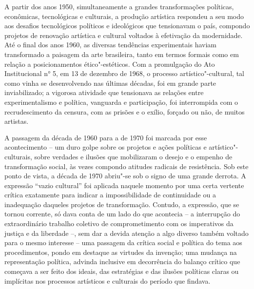 \pagebreak
\thispagestyle{empty}

\movetooddpage

A partir dos anos 1950, simultaneamente a grandes transformações
políticas, econômicas, tecnológicas e culturais, a produção artística
respondeu a seu modo aos desafios tecnológicos políticos e ideológicos
que tensionavam o país, compondo projetos de renovação artística e
cultural voltados à efetivação da modernidade. Até o final dos anos
1960, as diversas tendências experimentais haviam transformado a
paisagem da arte brasileira, tanto em termos formais como em relação a
posicionamentos ético"-estéticos. Com a promulgação do Ato Institucional
n° 5, em 13 de dezembro de 1968, o processo artístico"-cultural, tal como
vinha se desenvolvendo nas últimas décadas, foi em grande parte
inviabilizado; a vigorosa atividade que tensionava as relações entre
experimentalismo e política, vanguarda e participação, foi interrompida
com o recrudescimento da censura, com as prisões e o exílio, forçado ou
não, de muitos artistas.

A passagem da década de 1960 para a de 1970 foi marcada por esse
acontecimento -- um duro golpe sobre os projetos e ações políticas e
artístico"-culturais, sobre verdades e ilusões que mobilizaram o desejo e
o empenho de transformação social, às vezes compondo atitudes radicais
de resistência. Sob este ponto de vista, a década de 1970 abriu"-se sob o
signo de uma grande derrota. A expressão ``vazio cultural'' foi aplicada
naquele momento por uma certa vertente crítica exatamente para indicar a
impossibilidade de continuidade ou a inadequação daqueles projetos de
transformação. Contudo, a expressão, que se tornou corrente, só dava
conta de um lado do que acontecia -- a interrupção do extraordinário
trabalho coletivo de comprometimento com os imperativos da justiça e da
liberdade --, sem dar a devida atenção a algo diverso também voltado
para o mesmo interesse -- uma passagem da crítica social e política do
tema aos procedimentos, pondo em destaque as virtudes da invenção; uma
mudança na representação política, advinda inclusive em decorrência do
balanço crítico que começava a ser feito dos ideais, das estratégias e
das ilusões políticas claras ou implícitas nos processos artísticos e
culturais do período que findava.

